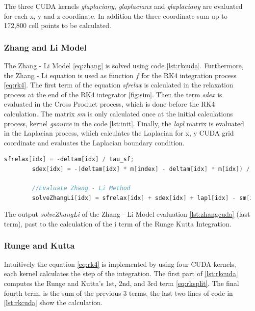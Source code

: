The three CUDA kernels \textit{glaplaciany}, \textit{glaplacianx} and \textit{glaplaciany} are evaluated for each x, y and z coordinate. In addition the three coordinate sum up to 172,800 cell points to be calculated.

\subsubsection{Zhang and Li Model}

The Zhang - Li Model \ref{eq:zhang} is solved using code \ref{lst:rkcuda}. Furthermore, the Zhang - Li equation is used as function $f$ for the RK4 integration process \ref{eq:rk4}. The first term of the equation \textit{sfrelax} is calculated in the relaxation process at the end of the RK4 integrator \ref{fig:sim}. Then the term \textit{sdex} is evaluated in the Cross Product process, which is done before the RK4 calculation. The matrix \textit{sm} is only calculated once at the initial calculations process, kernel \textit{gsource} in the code \ref{lst:init}. Finally, the \textit{lapl} matrix is evaluated in the Laplacian process, which calculates the Laplacian for x, y CUDA grid coordinate and evaluates the Laplacian boundary condition.

\begin{lstlisting}[language=C++, label={lst:zhangcuda}, caption={Runge and Kutta 4th Terms}]
		sfrelax[idx] = -deltam[idx] / tau_sf;
		sdex[idx] = -(deltam[idx] * m[index] - deltam[idx] * m[idx]) / tau_sd;
		
		//Evaluate Zhang - Li Method
        solveZhangLi[idx] = sfrelax[idx] + sdex[idx] + lapl[idx] - sm[idx];
\end{lstlisting}

The output  \textit{solveZhangLi} of the Zhang - Li Model evaluation \ref{lst:zhangcuda}  (last term), past to the calculation of the i term of the Runge Kutta Integration.

\subsubsection{Runge and Kutta}
 
Intuitively the equation \ref{eq:rk4} is implemented by using four CUDA kernels, each kernel calculates the step of the integration. The first part of \ref{lst:rkcuda} computes the Runge and Kutta's 1st, 2nd, and 3rd  term \ref{eq:rksplit}. The final fourth term, is the sum of the previous 3 terms, the last two lines of code in \ref{lst:rkcuda} show the calculation.

